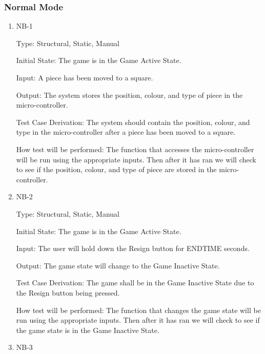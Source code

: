 \documentclass[12pt, titlepage]{article}
\begin{document}
  \subsubsection{Normal Mode}

  \begin{enumerate}

    \item{NB-1\\}

    Type: Structural, Static, Manual
                        
    Initial State: The game is in the Game Active State.
                        
    Input: A piece has been moved to a square.
                        
    Output: The system stores the position, colour, and type of piece in the micro-controller.
                        
    Test Case Derivation: The system should contain the position, colour, and type in the micro-controller
    after a piece has been moved to a square.

    How test will be performed: The function that accesses the micro-controller will be run using the appropriate inputs.
    Then after it has ran we will check to see if the position, colour, and type of piece are stored in the micro-controller.  

    \item{NB-2\\}

    Type: Structural, Static, Manual
                      
    Initial State: The game is in the Game Active State.
                        
    Input: The user will hold down the Resign button for ENDTIME seconds.
                        
    Output: The game state will change to the Game Inactive State.
                        
    Test Case Derivation: The game shall be in the Game Inactive State due to the Resign button being pressed.
    
    How test will be performed: The function that changes the game state will be run using the appropriate inputs.
    Then after it has ran we will check to see if the game state is in the Game Inactive State.

    \item{NB-3\\}


\end{enumerate}
\end{document}
